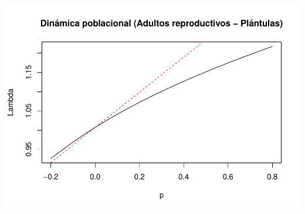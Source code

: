 \documentclass[
]{book}
\theoremstyle{definition}
\theoremstyle{definition}
\theoremstyle{definition}
\theoremstyle{definition}
\theoremstyle{remark}
\begin{document}
\includegraphics{Diagnostico_Poblacional_files/figure-latex/chap10_6-9.pdf}
\end{document}
